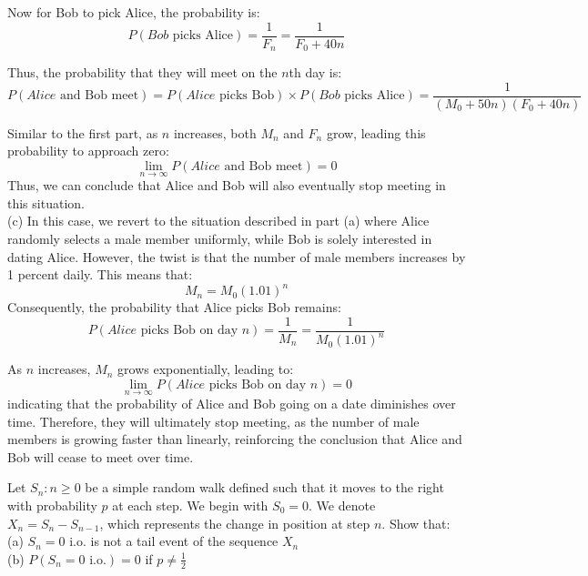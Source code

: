 \begin{solution}
    Now for Bob to pick Alice, the probability is:
    \[
    P(Bob \text{ picks Alice}) = \frac{1}{F_n} = \frac{1}{F_0 + 40n}
    \]
    
    Thus, the probability that they will meet on the \(n\)th day is:
    \[
    P(Alice \text{ and Bob meet}) = P(Alice \text{ picks Bob}) \times P(Bob \text{ picks Alice}) = \frac{1}{(M_0 + 50n)(F_0 + 40n)}
    \]
    
    Similar to the first part, as \(n\) increases, both \(M_n\) and \(F_n\) grow, leading this probability to approach zero:
    \[
    \lim_{n \to \infty} P(Alice \text{ and Bob meet}) = 0
    \]
    Thus, we can conclude that Alice and Bob will also eventually stop meeting in this situation.\\
    
    (c) In this case, we revert to the situation described in part (a) where Alice randomly selects a male member uniformly, while Bob is solely interested in dating Alice. However, the twist is that the number of male members increases by 1 percent daily. This means that:
    \[
    M_n = M_0(1.01)^n
    \]
    Consequently, the probability that Alice picks Bob remains:
    \[
    P(Alice \text{ picks Bob on day } n) = \frac{1}{M_n} = \frac{1}{M_0(1.01)^n}
    \]
    
    As \(n\) increases, \(M_n\) grows exponentially, leading to:
    \[
    \lim_{n \to \infty} P(Alice \text{ picks Bob on day } n) = 0
    \]
    indicating that the probability of Alice and Bob going on a date diminishes over time. Therefore, they will ultimately stop meeting, as the number of male members is growing faster than linearly, reinforcing the conclusion that Alice and Bob will cease to meet over time.
\end{solution}

\begin{exercise}
    Let \(S_n : n \geq 0\) be a simple random walk defined such that it moves to the right with probability \(p\) at each step. We begin with \(S_0 = 0\). We denote \(X_n = S_n - S_{n-1}\), which represents the change in position at step \(n\). Show that: \\
    (a) \(S_n = 0 \text{ i.o.}\) is not a tail event of the sequence ${X_n}$\\
    (b) \(P(S_n = 0 \text{ i.o.}) = 0\) if \(p \neq \frac{1}{2}\)
\end{exercise}

